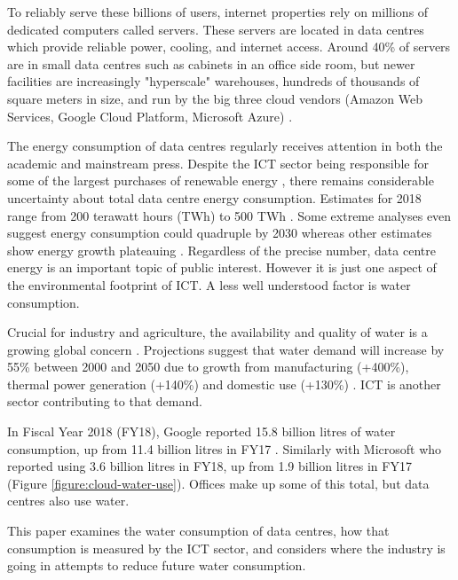 \documentclass{article}
\begin{document}
To reliably serve these billions of users, internet properties rely on millions
of dedicated computers called servers. These servers are located in data
centres which provide reliable power, cooling, and internet access. Around 40\%
of servers are in small data centres \cite{ganeshalingam_shining_2017} such as
cabinets in an office side room, but newer facilities are increasingly
"hyperscale" warehouses, hundreds of thousands of square meters in size, and
run by the big three cloud vendors (Amazon Web Services, Google Cloud Platform,
Microsoft Azure) \cite{shehabi_united_2016}.

The energy consumption of data centres regularly receives attention in both the
academic and mainstream press. Despite the ICT sector being responsible for
some of the largest purchases of renewable energy \cite{us_epa_green_2020},
there remains considerable uncertainty about total data centre energy
consumption. Estimates for 2018 range from 200 terawatt hours (TWh)
\cite{masanet_recalibrating_2020} to 500 TWh \cite{bashroush_beyond_2020}. Some
extreme analyses even suggest energy consumption could quadruple by 2030
\cite{andrae_global_2015} whereas other estimates show energy growth plateauing
\cite{masanet_recalibrating_2020}. Regardless of the precise number, data
centre energy is an important topic of public interest. However it is just one
aspect of the environmental footprint of ICT. A less well understood factor is
water consumption.

Crucial for industry and agriculture, the availability and quality of water is
a growing global concern \cite{unesco_united_2020}. Projections suggest that
water demand will increase by 55\% between 2000 and 2050 due to growth from
manufacturing (+400\%), thermal power generation (+140\%) and domestic use
(+130\%) \cite{oecd_oecd_2012}. ICT is another sector contributing to that
demand.

In Fiscal Year 2018 (FY18), Google reported 15.8 billion litres of water
consumption, up from 11.4 billion litres in FY17
\cite{google_environmental_2020}. Similarly with Microsoft who reported using
3.6 billion litres in FY18, up from 1.9 billion litres in FY17
\cite{microsoft_2019_2020} (Figure \ref{figure:cloud-water-use}). Offices make up
some of this total, but data centres also use water.

This paper examines the water consumption of data centres, how that
consumption is measured by the ICT sector, and considers where the industry is
going in attempts to reduce future water consumption.
\end{document}
